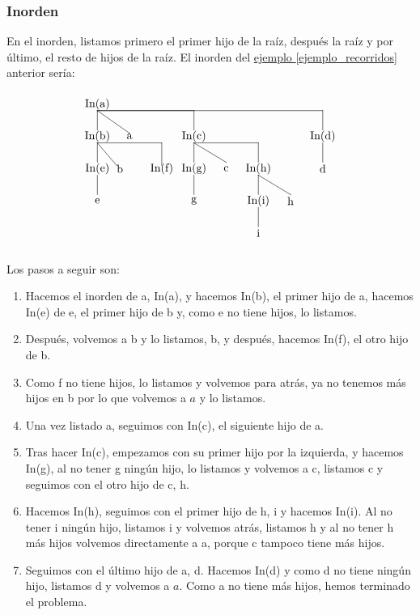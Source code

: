 \documentclass[10pt,a4paper,spanish]{report}
\begin{document}
\subsubsection{\textcolor[rgb]{0.3,0.4,0.8}Inorden}
\noindent
En el inorden, listamos primero el primer hijo de la raíz, después la raíz y por último, el resto de hijos de la raíz. El inorden del \hyperref[ejemplo_recorridos]{ejemplo \ref*{ejemplo_recorridos}} anterior sería:
\[\begin{xy}
,(0,0)*+=<10mm>\txt<2cm>{In(a)}
,(0,-10)*+=<10mm>\txt<2cm>{In(b)}
,(0,-20)*+=<10mm>\txt<2cm>{In(e)}
,(0,-30)*+=<10mm>\txt<2cm>{e}
,(7,-20)*+=<10mm>\txt<2cm>{b}
,(20,-20)*+=<10mm>\txt<2cm>{In(f)}
,(10,-10)*+=<10mm>\txt<2cm>{a}
,(30,-10)*+=<10mm>\txt<2cm>{In(c)}
,(30,-20)*+=<10mm>\txt<2cm>{In(g)}
,(30,-30)*+=<10mm>\txt<2cm>{g}
,(40,-20)*+=<10mm>\txt<2cm>{c}
,(50,-20)*+=<10mm>\txt<2cm>{In(h)}
,(50,-30)*+=<10mm>\txt<2cm>{In(i)}
,(50,-40)*+=<10mm>\txt<2cm>{i}
,(60,-30)*+=<10mm>\txt<2cm>{h}
,(70,-10)*+=<10mm>\txt<2cm>{In(d)}
,(70,-20)*+=<10mm>\txt<2cm>{d}

\ar@{-} (0,-2);(0,-8)
\ar@{-} (0,-12);(0,-18)
\ar@{-} (0,-22);(0,-28)
\ar@{-} (0,-12);(6,-19)
\ar@{-} (0,-12);(20,-12)
\ar@{-} (20,-12);(20,-19)
\ar@{-} (0,-2);(10,-9)
\ar@{-} (0,-2);(30,-2)
\ar@{-} (30,-2);(30,-8)
\ar@{-} (30,-12);(30,-18)
\ar@{-} (30,-22);(30,-28)
\ar@{-} (30,-12);(40,-18)
\ar@{-} (30,-12);(50,-12)
\ar@{-} (50,-12);(50,-18)
\ar@{-} (50,-22);(50,-28)
\ar@{-} (50,-32);(50,-38)
\ar@{-} (50,-22);(60,-28)
\ar@{-} (0,-2);(70,-2)
\ar@{-} (70,-2);(70,-8)
\ar@{-} (70,-12);(70,-18)
\end{xy}\]

\noindent
Los pasos a seguir son:
\begin{enumerate}[1.]
\item Hacemos el inorden de a, In(a), y hacemos In(b), el primer hijo de a, hacemos In(e) de e, el primer hijo de b y, como e no tiene hijos, lo listamos.
\item Después, volvemos a b y lo listamos, b, y después, hacemos In(f), el otro hijo de b.
\item Como f no tiene hijos, lo listamos y volvemos para atrás, ya no tenemos más hijos en b por lo que volvemos a $a$ y lo listamos.
\item Una vez listado a, seguimos con In(c), el siguiente hijo de a.
\item Tras hacer In(c), empezamos con su primer hijo por la izquierda, y hacemos In(g), al no tener g ningún hijo, lo listamos y volvemos a c, listamos c y seguimos con el otro hijo de c, h.
\item Hacemos In(h), seguimos con el primer hijo de h, i y hacemos In(i). Al no tener i ningún hijo, listamos i y volvemos atrás, listamos h y al no tener h más hijos volvemos directamente a a, porque c tampoco tiene más hijos.
\item Seguimos con el último hijo de a, d. Hacemos In(d) y como d no tiene ningún hijo, listamos d y volvemos a $a$. Como a no tiene más hijos, hemos terminado el problema.
\end{enumerate}
\end{document}
